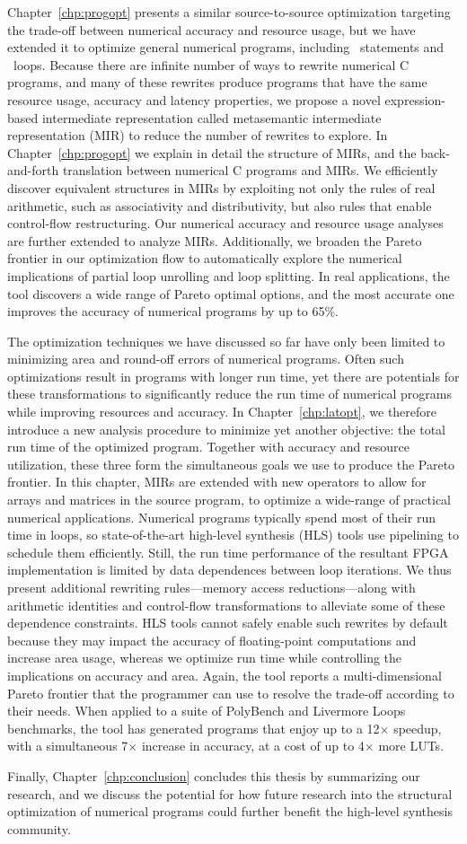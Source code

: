 Chapter~\ref{chp:progopt} presents a similar source-to-source optimization
targeting the trade-off between numerical accuracy and resource usage,
but we have extended it to optimize general numerical programs, including
\iflit~statements and \whilelit~loops.  Because there are infinite number
of ways to rewrite numerical C programs, and many of these rewrites produce
programs that have the same resource usage, accuracy and latency properties,
we propose a novel expression-based intermediate representation called
metasemantic intermediate representation (MIR) to reduce the number of rewrites
to explore.  In Chapter~\ref{chp:progopt} we explain in detail the structure of
MIRs, and the back-and-forth translation between numerical C programs and MIRs.
We efficiently discover equivalent structures in MIRs by exploiting not only
the rules of real arithmetic, such as associativity and distributivity, but
also rules that enable control-flow restructuring.  Our numerical accuracy and
resource usage analyses are further extended to analyze MIRs.  Additionally, we
broaden the Pareto frontier in our optimization flow to automatically explore
the numerical implications of partial loop unrolling and loop splitting.  In
real applications, the tool discovers a wide range of Pareto optimal options,
and the most accurate one improves the accuracy of numerical programs by up to
65\%.

The optimization techniques we have discussed so far have only been limited
to minimizing area and round-off errors of numerical programs.  Often such
optimizations result in programs with longer run time, yet there are potentials
for these transformations to significantly reduce the run time of numerical
programs while improving resources and accuracy.  In Chapter~\ref{chp:latopt},
we therefore introduce a new analysis procedure to minimize yet another
objective: the total run time of the optimized program.  Together with accuracy
and resource utilization, these three form the simultaneous goals we use to
produce the Pareto frontier.  In this chapter, MIRs are extended with new
operators to allow for arrays and matrices in the source program, to optimize a
wide-range of practical numerical applications.  Numerical programs typically
spend most of their run time in loops, so state-of-the-art high-level synthesis
(HLS) tools use pipelining to schedule them efficiently.  Still, the run
time performance of the resultant FPGA implementation is limited by data
dependences between loop iterations.  We thus present additional rewriting
rules---memory access reductions---along with arithmetic identities and
control-flow transformations to alleviate some of these dependence constraints.
HLS tools cannot safely enable such rewrites by default because they may impact
the accuracy of floating-point computations and increase area usage, whereas
we optimize run time while controlling the implications on accuracy and area.
Again, the tool reports a multi-dimensional Pareto frontier that the programmer
can use to resolve the trade-off according to their needs.  When applied to
a suite of PolyBench and Livermore Loops benchmarks, the tool has generated
programs that enjoy up to a 12$\times$ speedup, with a simultaneous 7$\times$
increase in accuracy, at a cost of up to 4$\times$ more LUTs.

Finally, Chapter~\ref{chp:conclusion} concludes this thesis by summarizing
our research, and we discuss the potential for how future research into the
structural optimization of numerical programs could further benefit the
high-level synthesis community.
